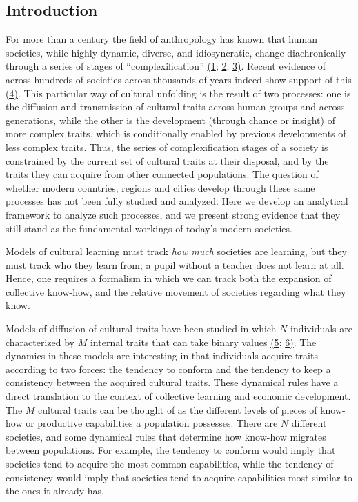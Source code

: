 \documentclass{pnastwo}
\begin{document}
\begin{article}
\section{Introduction}
\label{sec:intro} 
For more than a century the field of anthropology has known that human societies, while highly dynamic, diverse, and idiosyncratic, change diachronically through a series of stages of ``complexification'' \hyperref[csl:1]{(1}; \hyperref[csl:2]{2}; \hyperref[csl:3]{3)}. Recent evidence of across hundreds of societies across thousands of years indeed show support of this \hyperref[csl:4]{(4)}. This particular way of cultural unfolding is the result of two processes: one is the diffusion and transmission of cultural traits across human groups and across generations, while the other is the development (through chance or insight) of more complex traits, which is conditionally enabled by previous developments of less complex traits. Thus, the series of complexification stages of a society is constrained by the current set of cultural traits at their disposal, and by the traits they can acquire from other connected populations. The question of whether modern countries, regions and cities develop through these same processes has not been fully studied and analyzed. Here we develop an analytical framework to analyze such processes, and we present strong evidence that they still stand as the fundamental workings of today's modern societies.

Models of cultural learning must track \emph{how much} societies are learning, but they must track who they learn from; a pupil without a teacher does not learn at all. Hence, one requires a formalism in which we can track both the expansion of collective know-how, and the relative movement of societies regarding what they know.

Models of diffusion of cultural traits have been studied in which $N$ individuals are characterized by $M$ internal traits that can take binary values \hyperref[csl:5]{(5}; \hyperref[csl:6]{6)}. The dynamics in these models are interesting in that individuals acquire traits according to two forces: the tendency to conform and the tendency to keep a consistency between the acquired cultural traits. These dynamical rules have a direct translation to the context of collective learning and economic development. The $M$ cultural traits can be thought of as the different levels of pieces of know-how or productive capabilities a population possesses. There are $N$ different societies, and some dynamical rules that determine how know-how migrates between populations. For example, the tendency to conform would imply that societies tend to acquire the most common capabilities, while the tendency of consistency would imply that societies tend to acquire capabilities most similar to the ones it already has.


\end{article}
\end{document}
